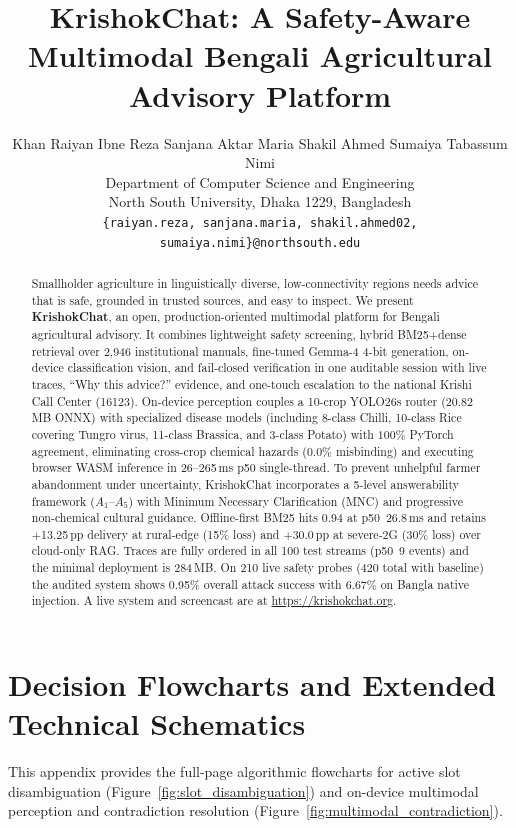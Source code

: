 \documentclass[11pt,a4paper]{article}
\title{KrishokChat: A Safety-Aware Multimodal Bengali Agricultural Advisory Platform}
\author{
  Khan Raiyan Ibne Reza \quad Sanjana Aktar Maria \quad Shakil Ahmed \quad Sumaiya Tabassum Nimi \\
  Department of Computer Science and Engineering \\
  North South University, Dhaka 1229, Bangladesh \\
  \texttt{\{raiyan.reza, sanjana.maria, shakil.ahmed02, sumaiya.nimi\}@northsouth.edu}
}
\date{}
\begin{document}
\maketitle

\begin{abstract}
Smallholder agriculture in linguistically diverse, low-connectivity regions needs advice that is safe, grounded in trusted sources, and easy to inspect. We present \textbf{KrishokChat}, an open, production-oriented multimodal platform for Bengali agricultural advisory. It combines lightweight safety screening, hybrid BM25+dense retrieval over 2,946 institutional manuals, fine-tuned Gemma-4 4-bit generation, on-device classification vision, and fail-closed verification in one auditable session with live traces, ``Why this advice?'' evidence, and one-touch escalation to the national Krishi Call Center (16123). On-device perception couples a 10-crop YOLO26s router ($20.82$\,MB ONNX) with specialized disease models (including 8-class Chilli, 10-class Rice covering Tungro virus, 11-class Brassica, and 3-class Potato) with $100\%$ PyTorch agreement, eliminating cross-crop chemical hazards ($0.0\%$ misbinding) and executing browser WASM inference in 26--265\,ms p50 single-thread. To prevent unhelpful farmer abandonment under uncertainty, KrishokChat incorporates a 5-level answerability framework ($A_1\text{--}A_5$) with Minimum Necessary Clarification (MNC) and progressive non-chemical cultural guidance. Offline-first BM25 hits 0.94 at p50~26.8\,ms and retains $+$13.25\,pp delivery at rural-edge (15\% loss) and $+$30.0\,pp at severe-2G (30\% loss) over cloud-only RAG. Traces are fully ordered in all 100 test streams (p50~9 events) and the minimal deployment is 284\,MB. On 210 live safety probes (420 total with baseline) the audited system shows 0.95\% overall attack success with 6.67\% on Bangla native injection. A live system and screencast are at \url{https://krishokchat.org}.
\end{abstract}









\clearpage
\appendix
\section{Decision Flowcharts and Extended Technical Schematics}
\label{sec:appendix_flowcharts}

This appendix provides the full-page algorithmic flowcharts for active slot disambiguation (Figure~\ref{fig:slot_disambiguation}) and on-device multimodal perception and contradiction resolution (Figure~\ref{fig:multimodal_contradiction}).



\end{document}
